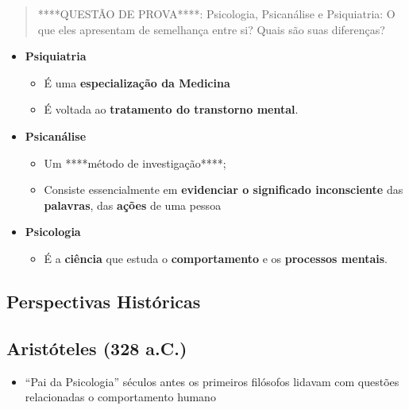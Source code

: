 \documentclass[
]{book}
\providecommand{\tightlist}{%
  \setlength{\itemsep}{0pt}\setlength{\parskip}{0pt}}
\begin{document}
\begin{quote}
****QUESTÃO DE PROVA****: Psicologia, Psicanálise e Psiquiatria: O que eles apresentam
de semelhança entre si? Quais são suas diferenças?
\end{quote}

\begin{itemize}
\tightlist
\item
  \textbf{Psiquiatria}

  \begin{itemize}
  \tightlist
  \item
    É uma \textbf{especialização da Medicina}
  \item
    É voltada ao \textbf{tratamento do transtorno mental}.
  \end{itemize}
\item
  \textbf{Psicanálise}

  \begin{itemize}
  \tightlist
  \item
    Um ****método de investigação****;
  \item
    Consiste essencialmente em \textbf{evidenciar o significado inconsciente} das \textbf{palavras}, das \textbf{ações} de uma pessoa
  \end{itemize}
\item
  \textbf{Psicologia}

  \begin{itemize}
  \tightlist
  \item
    É a \textbf{ciência} que estuda o \textbf{comportamento} e os \textbf{processos mentais}.
  \end{itemize}
\end{itemize}

\hypertarget{perspectivas-histuxf3ricas}{%
\subsection{Perspectivas Históricas}\label{perspectivas-histuxf3ricas}}

\hypertarget{aristuxf3teles-328-a.c.}{%
\subsection{Aristóteles (328 a.C.)}\label{aristuxf3teles-328-a.c.}}

\begin{itemize}
\tightlist
\item
  ``Pai da Psicologia'' séculos antes os primeiros filósofos lidavam com questões relacionadas o comportamento humano
\end{itemize}
\end{document}
